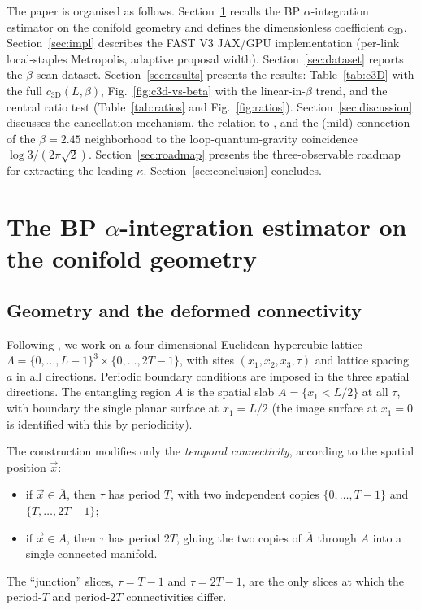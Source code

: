 \documentclass[11pt,a4paper]{article}
\theoremstyle{definition}
\newcommand{\bA}{\overline{A}}
\newcommand{\threeD}{{3\text{D}}}
\begin{document}
\medskip
The paper is organised as follows. Section~\ref{sec:method} recalls
the BP $\alpha$-integration estimator on the conifold geometry and
defines the dimensionless coefficient $c_{\threeD}$. Section~\ref{sec:impl}
describes the FAST V3 JAX/GPU implementation (per-link local-staples
Metropolis, adaptive proposal width). Section~\ref{sec:dataset}
reports the $\beta$-scan dataset. Section~\ref{sec:results} presents
the results: Table~\ref{tab:c3D} with the full $c_{\threeD}(L,\beta)$,
Fig.~\ref{fig:c3d-vs-beta} with the linear-in-$\beta$ trend, and the
central ratio test (Table~\ref{tab:ratios} and
Fig.~\ref{fig:ratios}). Section~\ref{sec:discussion} discusses the
cancellation mechanism, the relation to
\cite{Rabenstein2019}, and the (mild) connection of the $\beta = 2.45$
neighborhood to the loop-quantum-gravity coincidence $\log
3/(2\pi\sqrt 2)$. Section~\ref{sec:roadmap} presents the
three-observable roadmap for extracting the leading $\kappa$.
Section~\ref{sec:conclusion} concludes.


\section{The BP $\alpha$-integration estimator on the conifold geometry}
\label{sec:method}

\subsection{Geometry and the deformed connectivity}
\label{sec:geometry}

Following \cite{BP2008b,Rabenstein2019}, we work on a four-dimensional
Euclidean hypercubic lattice $\Lambda = \{0,\ldots,L-1\}^{3} \times
\{0,\ldots,2T-1\}$, with sites $(x_{1},x_{2},x_{3},\tau)$ and lattice
spacing $a$ in all directions. Periodic boundary conditions are
imposed in the three spatial directions. The entangling region $A$ is
the spatial slab $A = \{x_{1} < L/2\}$ at all $\tau$, with boundary
the single planar surface at $x_{1} = L/2$ (the image surface at
$x_{1} = 0$ is identified with this by periodicity).

The construction modifies only the \emph{temporal connectivity},
according to the spatial position $\vec x$:
\begin{itemize}[leftmargin=*]
\item if $\vec x \in \bA$, then $\tau$ has period $T$, with two
      independent copies $\{0,\ldots,T-1\}$ and $\{T,\ldots,2T-1\}$;
\item if $\vec x \in A$, then $\tau$ has period $2T$, gluing the two
      copies of $\bA$ through $A$ into a single connected manifold.
\end{itemize}
The ``junction'' slices, $\tau = T-1$ and $\tau = 2T-1$, are the only
slices at which the period-$T$ and period-$2T$ connectivities differ.
\end{document}
